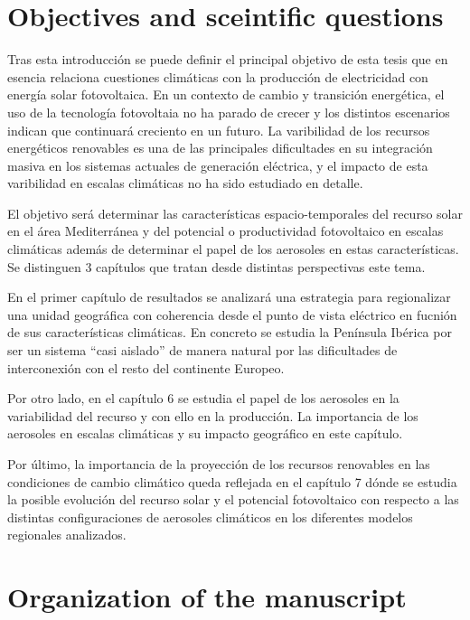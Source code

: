\section{Objectives and sceintific questions}%

Tras esta introducción se puede definir el principal objetivo de esta tesis que en esencia relaciona cuestiones climáticas con la producción de electricidad con energía solar fotovoltaica. En un contexto de cambio y transición energética, el uso de la tecnología fotovoltaia no ha parado de crecer y los distintos escenarios indican que continuará creciento en un futuro. La varibilidad de los recursos energéticos renovables es una de las principales dificultades en su integración masiva en los sistemas actuales de generación eléctrica, y el impacto de esta varibilidad en escalas climáticas no ha sido estudiado en detalle.

El objetivo será determinar las características espacio-temporales del recurso solar en el área Mediterránea y del potencial o productividad fotovoltaico en escalas climáticas además de determinar el papel de los aerosoles en estas características. Se distinguen 3 capítulos que tratan desde distintas perspectivas este tema.

En el primer capítulo de resultados se analizará una estrategia para regionalizar una unidad geográfica con coherencia desde el punto de vista eléctrico en fucnión de sus características climáticas. En concreto se estudia la Península Ibérica por ser un sistema ``casi aislado'' de manera natural por las dificultades de interconexión con el resto del continente Europeo. 

Por otro lado, en el capítulo 6 se estudia el papel de los aerosoles en la variabilidad del recurso y con ello en la producción. La importancia de los aerosoles en escalas climáticas y su impacto geográfico en este capítulo.

Por último, la importancia de la proyección de los recursos renovables en las condiciones de cambio climático queda reflejada en el capítulo 7 dónde se estudia la posible evolución del recurso solar y el potencial fotovoltaico con respecto a las distintas configuraciones de aerosoles climáticos en los diferentes modelos regionales analizados.

\section{Organization of the manuscript}%

